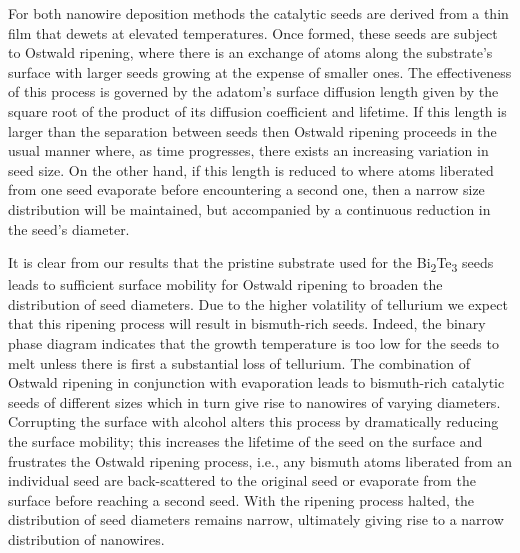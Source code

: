 For both nanowire deposition methods the catalytic seeds are derived from a thin film that dewets at elevated temperatures.
Once formed, these seeds are subject to Ostwald ripening, where there is an exchange of atoms along the substrate's surface with larger seeds growing at the expense of smaller ones\cite{Raab2000a,Li2003b}.
The effectiveness of this process is governed by the adatom's surface diffusion length given by the square root of the product of its diffusion coefficient and lifetime.
If this length is larger than the separation between seeds then Ostwald ripening proceeds in the usual manner where, as time progresses, there exists an increasing variation in seed size.
On the other hand, if this length is reduced to where atoms liberated from one seed evaporate before encountering a second one, then a narrow size distribution will be maintained, but accompanied by a continuous reduction in the seed's diameter.

It is clear from our results that the pristine substrate used for the Bi\textsubscript{2}Te\textsubscript{3} seeds leads to sufficient surface mobility for Ostwald ripening to broaden the distribution of seed diameters.
Due to the higher volatility of tellurium we expect that this ripening process will result in bismuth-rich seeds.
Indeed, the binary phase diagram indicates that the growth temperature is too low for the seeds to melt unless there is first a substantial loss of tellurium\cite{MassalskiTBMurrayJL1986}.
The combination of Ostwald ripening in conjunction with evaporation leads to bismuth-rich catalytic seeds of different sizes which in turn give rise to nanowires of varying diameters.
Corrupting the surface with alcohol alters this process by dramatically reducing the surface mobility; this increases the lifetime of the seed on the surface and frustrates the Ostwald ripening process, i.e., any bismuth atoms liberated from an individual seed are back-scattered to the original seed or evaporate from the surface before reaching a second seed.
With the ripening process halted, the distribution of seed diameters remains narrow, ultimately giving rise to a narrow distribution of nanowires.

